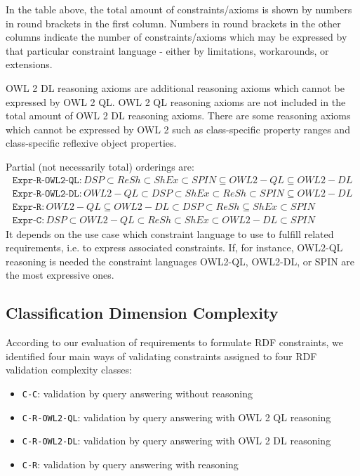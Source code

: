 \documentclass{llncs}
\newcommand{\ms}[1]{\texttt{#1}}
\begin{document}
In the table above, the total amount of constraints/axioms is shown by numbers in round brackets in the first column.
Numbers in round brackets in the other columns indicate the number of constraints/axioms which may be expressed by that particular constraint language - either by limitations, workarounds, or extensions.  

OWL 2 DL reasoning axioms are additional reasoning axioms which cannot be expressed by OWL 2 QL. 
OWL 2 QL reasoning axioms are not included in the total amount of OWL 2 DL reasoning axioms.
There are some reasoning axioms which cannot be expressed by OWL 2 such as class-specific property ranges and class-specific reflexive object properties.

Partial (not necessarily total) orderings are:
\begin{eqnarray*}
\ms{Expr-R-OWL2-QL}: DSP \subset ReSh \subset ShEx \subset SPIN \subseteq OWL2-QL \subseteq OWL2-DL \\
\ms{Expr-R-OWL2-DL}: OWL2-QL \subset DSP \subset ShEx \subset ReSh \subset SPIN \subseteq OWL2-DL \\
\ms{Expr-R}: OWL2-QL \subseteq OWL2-DL \subset DSP \subset ReSh \subseteq ShEx \subset SPIN \\
\ms{Expr-C}: DSP \subset OWL2-QL \subset ReSh \subset ShEx \subset OWL2-DL \subset SPIN
\end{eqnarray*}
It depends on the use case which constraint language to use to fulfill related requirements, i.e. to express associated constraints.
If, for instance, OWL2-QL reasoning is needed the constraint languages OWL2-QL, OWL2-DL, or SPIN are the most expressive ones.

\subsection{Classification Dimension Complexity}

According to our evaluation of requirements to formulate RDF constraints, we identified four main ways of validating constraints assigned to four RDF validation complexity classes:

\begin{itemize}
	\item \ms{C-C}: validation by query answering without reasoning
	\item \ms{C-R-OWL2-QL}: validation by query answering with OWL 2 QL reasoning
	\item \ms{C-R-OWL2-DL}: validation by query answering with OWL 2 DL reasoning
	\item \ms{C-R}: validation by query answering with reasoning
\end{itemize}
\end{document}
